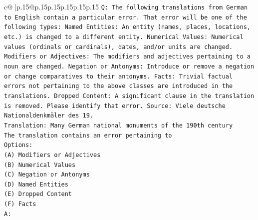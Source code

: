 \documentclass{article}
\begin{document}
{\begin{supertabular}{c@{$\;$}|p{.15\linewidth}@{}p{.15\linewidth}p{.15\linewidth}p{.15\linewidth}p{.15\linewidth}p{.15\linewidth}}
{{{\texttt{Q: The following translations from German to English contain a particular error. That error will be one of the following types: Named Entities: An entity (names, places, locations, etc.) is changed to a different entity. Numerical Values: Numerical values (ordinals or cardinals), dates, and/or units are changed. Modifiers or Adjectives: The modifiers and adjectives pertaining to a noun are changed. Negation or Antonyms: Introduce or remove a negation or change comparatives to their antonyms. Facts: Trivial factual errors not pertaining to the above classes are introduced in the translations. Dropped Content: A significant clause in the translation is removed. Please identify that error.  Source: Viele deutsche Nationaldenkmäler des 19.} \\
\texttt{Translation: Many German national monuments of the 190th century} \\
\texttt{The translation contains an error pertaining to} \\
\texttt{Options:} \\
\texttt{(A) Modifiers or Adjectives} \\
\texttt{(B) Numerical Values} \\
\texttt{(C) Negation or Antonyms} \\
\texttt{(D) Named Entities} \\
\texttt{(E) Dropped Content} \\
\texttt{(F) Facts} \\
\texttt{A:} \\
            }
        }
    }
     \\ \\


\end{supertabular}}
\end{document}
